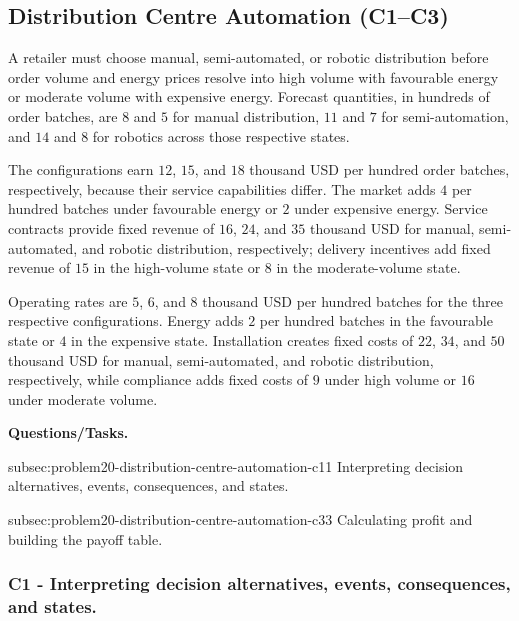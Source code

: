 	\subsection{Distribution Centre Automation (C1--C3)}
	\label{sec:problem20-distribution-centre-automation-c1-c3}

	A retailer must choose manual, semi-automated, or robotic distribution before order volume and energy prices resolve into high volume with favourable energy or moderate volume with expensive energy. Forecast quantities, in hundreds of order batches, are \(8\) and \(5\) for manual distribution, \(11\) and \(7\) for semi-automation, and \(14\) and \(8\) for robotics across those respective states.

	The configurations earn \(12\), \(15\), and \(18\) thousand USD per hundred order batches, respectively, because their service capabilities differ. The market adds \(4\) per hundred batches under favourable energy or \(2\) under expensive energy. Service contracts provide fixed revenue of \(16\), \(24\), and \(35\) thousand USD for manual, semi-automated, and robotic distribution, respectively; delivery incentives add fixed revenue of \(15\) in the high-volume state or \(8\) in the moderate-volume state.

	Operating rates are \(5\), \(6\), and \(8\) thousand USD per hundred batches for the three respective configurations. Energy adds \(2\) per hundred batches in the favourable state or \(4\) in the expensive state. Installation creates fixed costs of \(22\), \(34\), and \(50\) thousand USD for manual, semi-automated, and robotic distribution, respectively, while compliance adds fixed costs of \(9\) under high volume or \(16\) under moderate volume.

	\textbf{Questions/Tasks.}
	\begin{enumerate}
		\CriterionTask
		{subsec:problem20-distribution-centre-automation-c1}{1}
		{Interpreting decision alternatives, events, consequences, and states.}

		\CriterionTask
		{subsec:problem20-distribution-centre-automation-c3}{3}
		{Calculating profit and building the payoff table.}
	\end{enumerate}

	\subsubsection*{C1 - Interpreting decision alternatives, events, consequences, and states.}
	\label{subsec:problem20-distribution-centre-automation-c1}

